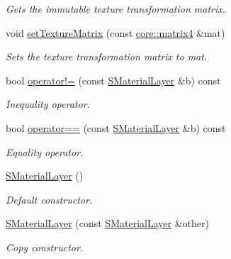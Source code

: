 \begin{DoxyCompactItemize}
\begin{DoxyCompactList}\small\item\em Gets the immutable texture transformation matrix. \end{DoxyCompactList}\item 
void \hyperlink{classirr_1_1video_1_1SMaterialLayer_a0f84f47351a17b2a6041688a425fda1a}{set\+Texture\+Matrix} (const \hyperlink{namespaceirr_1_1core_a4c9d4e29899535971052810954a14431}{core\+::matrix4} \&mat)
\begin{DoxyCompactList}\small\item\em Sets the texture transformation matrix to mat. \end{DoxyCompactList}\item 
bool \hyperlink{classirr_1_1video_1_1SMaterialLayer_a2d379f02b6a06600df2b0eaf252c8f71}{operator!=} (const \hyperlink{classirr_1_1video_1_1SMaterialLayer}{S\+Material\+Layer} \&b) const
\begin{DoxyCompactList}\small\item\em Inequality operator. \end{DoxyCompactList}\item 
bool \hyperlink{classirr_1_1video_1_1SMaterialLayer_a0c342c76ebd572bba7ae0922a22dadb7}{operator==} (const \hyperlink{classirr_1_1video_1_1SMaterialLayer}{S\+Material\+Layer} \&b) const
\begin{DoxyCompactList}\small\item\em Equality operator. \end{DoxyCompactList}\item 
\mbox{\label{classirr_1_1video_1_1SMaterialLayer_aa33412579ecf68093eec0926cfddfcda}} 
\hyperlink{classirr_1_1video_1_1SMaterialLayer_aa33412579ecf68093eec0926cfddfcda}{S\+Material\+Layer} ()
\begin{DoxyCompactList}\small\item\em Default constructor. \end{DoxyCompactList}\item 
\hyperlink{classirr_1_1video_1_1SMaterialLayer_afb8b8d94178e389f8afa1e6190a35f9d}{S\+Material\+Layer} (const \hyperlink{classirr_1_1video_1_1SMaterialLayer}{S\+Material\+Layer} \&other)
\begin{DoxyCompactList}\small\item\em Copy constructor. \end{DoxyCompactList}\item 
\mbox{\label{classirr_1_1video_1_1SMaterialLayer_a3a95dd1993dcc1f2d4bf873602b49b4e}} 

\end{DoxyCompactItemize}
